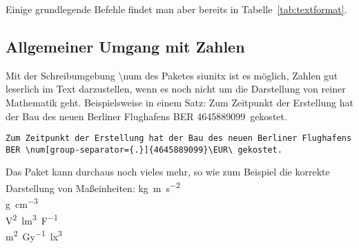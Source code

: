 \begin{table}[htbp]
  \caption{Grundlegende Textformatierung}
  \label{tab:textformat}
\end{table}

Einige grundlegende Befehle findet man aber bereits in Tabelle~\ref{tab:textformat}.
\subsection{Allgemeiner Umgang mit Zahlen}%
\label{sec:allgzahl}
Mit der Schreibumgebung \textbackslash num des Paketes siunitx ist es möglich, Zahlen gut leserlich im Text darzustellen, wenn es noch nicht um die Darstellung von reiner Mathematik geht. Beispielsweise in einem Satz: Zum Zeitpunkt der Erstellung hat der Bau des neuen Berliner Flughafens BER \num[group-separator={.}]{4645889099}\EUR\ gekostet.
\begin{lstlisting}[float=htpb,caption=Darstellung von Zahlen in \protect\LaTeX{},label=lst:zahlen]
Zum Zeitpunkt der Erstellung hat der Bau des neuen Berliner Flughafens BER \num[group-separator={.}]{4645889099}\EUR\ gekostet.
\end{lstlisting}

Das Paket kann durchaus noch vieles mehr, so wie zum Beispiel die korrekte Darstellung von Maßeinheiten:
\si{\kilo\gram\metre\per\square\second} \\
\si{\gram\per\cubic\centi\metre}
\\
\si{\square\volt\cubic\lumen\per\farad} \\
\si{\metre\squared\per\gray\cubic\lux}


